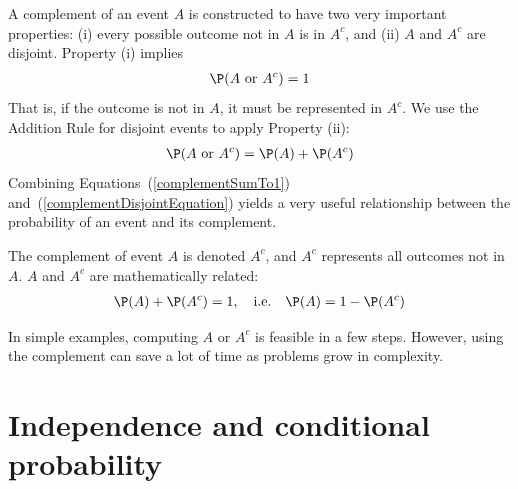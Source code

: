 

A complement of an event $A$ is constructed to have two very important properties: (i) every possible outcome not in $A$ is in $A^c$, and (ii) $A$ and $A^c$ are disjoint. Property (i) implies
\begin{eqnarray}
\P(A\text{ or }A^c) = 1
\label{complementSumTo1}
\end{eqnarray}
That is, if the outcome is not in $A$, it must be represented in $A^c$. We use the Addition Rule for disjoint events to apply Property (ii):
\begin{eqnarray}
\P(A\text{ or }A^c) = \P(A) + \P(A^c)
\label{complementDisjointEquation}
\end{eqnarray}
Combining Equations~(\ref{complementSumTo1}) and~(\ref{complementDisjointEquation}) yields a very useful relationship between the probability of an event and its complement.

\begin{termBox}{
The complement of event $A$ is denoted $A^c$, and $A^c$ represents all outcomes not in~$A$. $A$ and $A^c$ are mathematically related: \vspace{-2mm}
\begin{eqnarray}\label{complement}
\P(A) + \P(A^c) = 1, \quad\text{i.e.}\quad \P(A) = 1-\P(A^c)
\end{eqnarray}\vspace{-6.5mm}}
\end{termBox}

In simple examples, computing $A$ or $A^c$ is feasible in a few steps. However, using the complement can save a lot of time as problems grow in complexity.


\section{Independence and conditional probability}
\label{probabilityIndependence}

\label{conditionalProbabilitySection}
